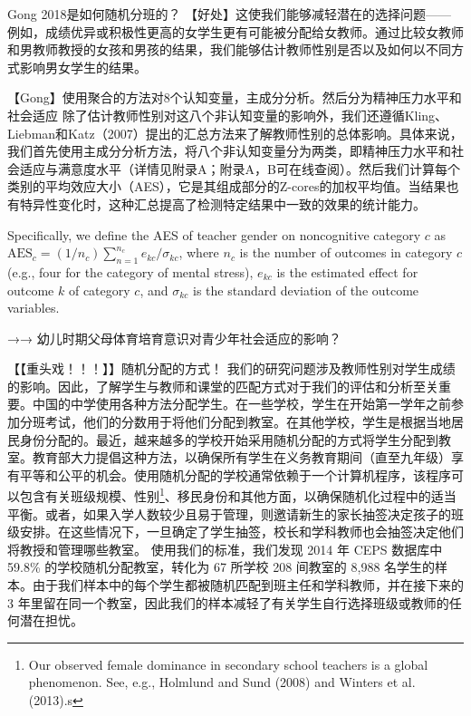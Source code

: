 Gong 2018是如何随机分班的？
【好处】这使我们能够减轻潜在的选择问题——例如，成绩优异或积极性更高的女学生更有可能被分配给女教师。通过比较女教师和男教师教授的女孩和男孩的结果，我们能够估计教师性别是否以及如何以不同方式影响男女学生的结果。

【Gong】使用聚合的方法对8个认知变量，主成分分析。然后分为精神压力水平和社会适应
除了估计教师性别对这八个非认知变量的影响外，我们还遵循Kling、Liebman和Katz（2007）提出的汇总方法来了解教师性别的总体影响。具体来说，我们首先使用主成分分析方法，将八个非认知变量分为两类，即精神压力水平和社会适应与满意度水平（详情见附录A；附录A，B可在线查阅）。然后我们计算每个类别的平均效应大小（AES），它是其组成部分的Z-cores的加权平均值。当结果也有特异性变化时，这种汇总提高了检测特定结果中一致的效果的统计能力。

Specifically, we define the AES of teacher gender on noncognitive category $c$ as $\mathrm{AES}_c=\left(1 / n_c\right) \sum_{n=1}^{n_c} e_{k c} / \sigma_{k c}$, where $n_c$ is the number of outcomes in category $c$ (e.g., four for the category of mental stress), $e_{k c}$ is the estimated effect for outcome $k$ of category $c$, and $\sigma_{k c}$ is the standard deviation of the outcome variables.



→→ 幼儿时期父母体育培育意识对青少年社会适应的影响？

【【重头戏！！！】】随机分配的方式！
我们的研究问题涉及教师性别对学生成绩的影响。因此，了解学生与教师和课堂的匹配方式对于我们的评估和分析至关重要。中国的中学使用各种方法分配学生。在一些学校，学生在开始第一学年之前参加分班考试，他们的分数用于将他们分配到教室。在其他学校，学生是根据当地居民身份分配的。最近，越来越多的学校开始采用随机分配的方式将学生分配到教室。教育部大力提倡这种方法，以确保所有学生在义务教育期间（直至九年级）享有平等和公平的机会。使用随机分配的学校通常依赖于一个计算机程序，该程序可以包含有关班级规模、性别\footnote{Our observed female dominance in secondary school teachers is a global phenomenon. See, e.g., Holmlund and Sund (2008) and Winters et al. (2013).s}、移民身份和其他方面，以确保随机化过程中的适当平衡。或者，如果入学人数较少且易于管理，则邀请新生的家长抽签决定孩子的班级安排。在这些情况下，一旦确定了学生抽签，校长和学科教师也会抽签决定他们将教授和管理哪些教室。
使用我们的标准，我们发现 2014 年 CEPS 数据库中 59.8\% 的学校随机分配教室，转化为 67 所学校 208 间教室的 8,988 名学生的样本。由于我们样本中的每个学生都被随机匹配到班主任和学科教师，并在接下来的 3 年里留在同一个教室，因此我们的样本减轻了有关学生自行选择班级或教师的任何潜在担忧。


